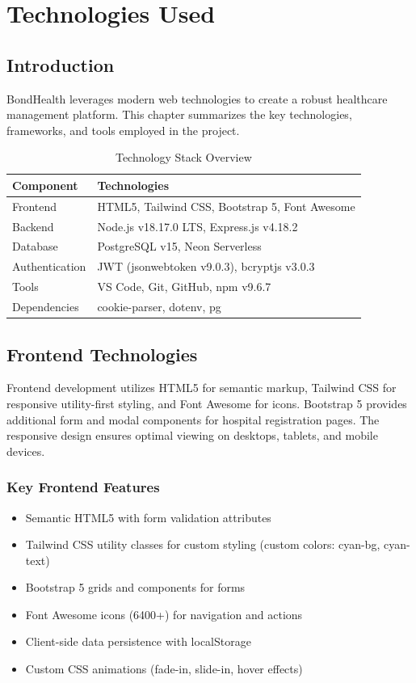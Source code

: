 \chapter{Technologies Used}

\section{Introduction}
BondHealth leverages modern web technologies to create a robust healthcare management platform. This chapter summarizes the key technologies, frameworks, and tools employed in the project.

\begin{table}[H]
    \centering
    \small
    \begin{tabular}{|l|p{9cm}|}
        \hline
        \textbf{Component} & \textbf{Technologies} \\
        \hline
        Frontend & HTML5, Tailwind CSS, Bootstrap 5, Font Awesome \\
        \hline
        Backend & Node.js v18.17.0 LTS, Express.js v4.18.2 \\
        \hline
        Database & PostgreSQL v15, Neon Serverless \\
        \hline
        Authentication & JWT (jsonwebtoken v9.0.3), bcryptjs v3.0.3 \\
        \hline
        Tools & VS Code, Git, GitHub, npm v9.6.7 \\
        \hline
        Dependencies & cookie-parser, dotenv, pg \\
        \hline
    \end{tabular}
    \caption{Technology Stack Overview}
    \label{tab:tech-stack}
\end{table}

\section{Frontend Technologies}

Frontend development utilizes HTML5 for semantic markup, Tailwind CSS for responsive utility-first styling, and Font Awesome for icons. Bootstrap 5 provides additional form and modal components for hospital registration pages. The responsive design ensures optimal viewing on desktops, tablets, and mobile devices.

\subsection{Key Frontend Features}
\begin{itemize}
    \item Semantic HTML5 with form validation attributes
    \item Tailwind CSS utility classes for custom styling (custom colors: cyan-bg, cyan-text)
    \item Bootstrap 5 grids and components for forms
    \item Font Awesome icons (6400+) for navigation and actions
    \item Client-side data persistence with localStorage
    \item Custom CSS animations (fade-in, slide-in, hover effects)
\end{itemize}

